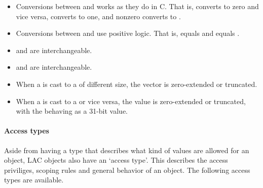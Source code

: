 \begin{itemize}

\item Conversions between  and  works as they do in
C. That is,  converts to zero and vice versa,  converts
to one, and nonzero converts to .

\item Conversions between  and  use positive logic. That
is,  equals  and  equals .

\item {} and  are interchangeable.

\item {} and  are interchangeable.

\item When a  is cast to a  of different size, the
vector is zero-extended or truncated.

\item When a  is cast to a  or vice versa, the
value is zero-extended or truncated, with the  behaving as a
31-bit value.

\end{itemize}

\paragraph*{Access types} Aside from having a type that describes what kind of 
values are allowed for an object, LAC objects also have an `access type'. This 
describes the access priviliges, scoping rules and general behavior of an 
object. The following access types are available.

